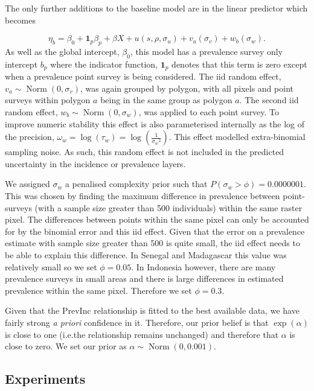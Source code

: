 \documentclass{statsoc}
\begin{document}
The only further additions to the baseline model are in the linear predictor which becomes 

$$\eta_b = \beta_0 + \mathbf{1}_p\beta_p +  \beta X  + u(s, \rho, \sigma_u) + v_a(\sigma_v) + w_b(\sigma_w).$$
As well as the global intercept, $\beta_0$, this model has a prevalence survey only intercept $b_p$ where the indicator function, $\mathbf{1}_p$ denotes that this term is zero except when a prevalence point survey is being considered.
The iid random effect, $v_a \sim \operatorname{Norm}(0, \sigma_v)$, was again grouped by polygon, with all pixels and point surveys within polygon $a$ being in the same group as polygon $a$.
The second iid random effect, $w_b \sim \operatorname{Norm}(0, \sigma_w)$, was applied to each point survey.
To improve numeric stability this effect is also parameterised internally as the log of the precision, $\omega_w = \log(\tau_w) = \log(\frac{1}{{\sigma_w}^2})$.
This effect modelled extra-binomial sampling noise.
As such, this random effect is not included in the predicted uncertainty in the incidence or prevalence layers.


We assigned $\sigma_w$ a penalised complexity prior such that $P(\sigma_w > \phi) = 0.0000001$. 
This was chosen by finding the maximum difference in prevalence between point-surveys (with a sample size greater than 500 individuals) within the same raster pixel.
The differences between points within the same pixel can only be accounted for by the binomial error and this iid effect.
Given that the error on a prevalence estimate with sample size greater than 500 is quite small, the iid effect needs to be able to explain this difference.
In Senegal and Madagascar this value was relatively small so we set $\phi = 0.05$. 
In Indonesia however, there are many prevalence surveys in small areas and there is large differences in estimated prevalence within the same pixel.
Therefore we set $\phi = 0.3$.

Given that the PrevInc relationship is fitted to the best available data, we have fairly strong \emph{a priori} confidence in it.
Therefore, our prior belief is that $\exp(\alpha)$ is close to one (i.e.\thinspace the relationship remains unchanged) and therefore that $\alpha$ is close to zero.
We set our prior as $\alpha \sim \operatorname{Norm}(0, 0.001)$.


\subsection*{Experiments}
\end{document}

